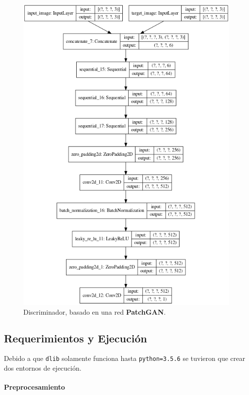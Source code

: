 \documentclass[10pt,journal,compsoc]{IEEEtran}\usepackage[T1]{fontenc}                              %
\begin{document}
\begin{figure}[!htb]
  \begin{center}
    \includegraphics[width=\linewidth]{./imgs/16_discriminador.png}
    \caption{Discriminador, basado en una red \textbf{PatchGAN}.}
    \label{fig:102}
  \end{center}
\end{figure}

\subsection{Requerimientos y Ejecución}

Debido a que \texttt{dlib} solamente funciona hasta
\texttt{python=3.5.6} se tuvieron que crear dos entornos de ejecución.

\paragraph{Preprocesamiento}
\end{document}
